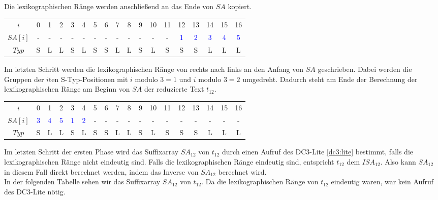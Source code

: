 Die lexikographischen Ränge werden anschließend an das Ende von $SA$ kopiert.

\begin{table}[H]
	\centering
	\begin{tabular}{c| c c c c c c c c c c c c c c c c c}
		$i$ & 0 & 1 & 2 & 3 & 4 & 5 & 6 & 7 & 8 & 9 & 10 & 11 & 12 & 13 & 14 & 15 & 16 \\
		$SA[i]$ & - & - & - & - & - & - & - & - & - & - & - & - & \textcolor{blue}{1} & \textcolor{blue}{2} & \textcolor{blue}{3} & \textcolor{blue}{4} & \textcolor{blue}{5} \\
		$Typ$ & S & L & L & S & L & S & S & L & L & S & L & S & S & S & L & L & L
	\end{tabular}
\end{table}

Im letzten Schritt werden die lexikographischen Ränge von rechts nach links an den Anfang von $SA$ geschrieben. Dabei werden die Gruppen der $i$ten S-Typ-Positionen mit $i \text{ modulo } 3 = 1$ und $i \text{ modulo } 3 = 2$ umgedreht. Dadurch steht am Ende der Berechnung der lexikographischen Ränge am Beginn von $SA$ der reduzierte Text $t_{12}$.

\begin{table}[H]
	\centering
	\begin{tabular}{c| c c c c c c c c c c c c c c c c c}
		$i$ & 0 & 1 & 2 & 3 & 4 & 5 & 6 & 7 & 8 & 9 & 10 & 11 & 12 & 13 & 14 & 15 & 16 \\
		$SA[i]$ & \textcolor{blue}{3} & \textcolor{blue}{4} & \textcolor{blue}{5} & \textcolor{blue}{1} & \textcolor{blue}{2} & - & - & - & - & - & - & - & - & - & - & - & - \\
		$Typ$ & S & L & L & S & L & S & S & L & L & S & L & S & S & S & L & L & L
	\end{tabular}
\end{table}

Im letzten Schritt der ersten Phase wird das Suffixarray $SA_{12}$ von $t_{12}$ durch einen Aufruf des DC3-Lite \cref{dc3:lite} bestimmt, falls die lexikographischen Ränge nicht eindeutig sind. Falls die lexikographischen Ränge eindeutig sind, entspricht $t_{12}$ dem $ISA_{12}$. Also kann $SA_{12}$ in diesem Fall direkt berechnet werden, indem das Inverse von $SA_{12}$ berechnet wird. \\
In der folgenden Tabelle sehen wir das Suffixarray $SA_{12}$ von $t_{12}$. Da die lexikographischen Ränge von $t_{12}$ eindeutig waren, war kein Aufruf des DC3-Lite nötig.

